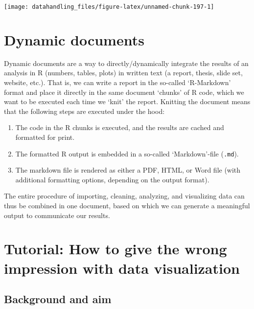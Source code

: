 \documentclass[
  12pt,
]{style/krantz}
\providecommand{\tightlist}{%
  \setlength{\itemsep}{0pt}\setlength{\parskip}{0pt}}
\begin{document}
\texttt{[image: datahandling\_files/figure-latex/unnamed-chunk-197-1]}

\hypertarget{dynamic-documents}{%
\section{Dynamic documents}\label{dynamic-documents}}

Dynamic documents are a way to directly/dynamically integrate the results of an analysis in R (numbers, tables, plots) in written text (a report, thesis, slide set, website, etc.). That is, we can write a report in the so-called `R-Markdown' format and place it directly in the same document `chunks' of R code, which we want to be executed each time we `knit' the report. Knitting the document means that the following steps are executed under the hood:

\begin{enumerate}
\def\labelenumi{\arabic{enumi}.}
\tightlist
\item
  The code in the R chunks is executed, and the results are cached and formatted for print.
\item
  The formatted R output is embedded in a so-called `Markdown'-file (\texttt{.md}).
\item
  The markdown file is rendered as either a PDF, HTML, or Word file (with additional formatting options, depending on the output format).
\end{enumerate}

The entire procedure of importing, cleaning, analyzing, and visualizing data can thus be combined in one document, based on which we can generate a meaningful output to communicate our results.

\hypertarget{tutorial-how-to-give-the-wrong-impression-with-data-visualization}{%
\section{Tutorial: How to give the wrong impression with data visualization}\label{tutorial-how-to-give-the-wrong-impression-with-data-visualization}}

\hypertarget{background-and-aim}{%
\subsection{Background and aim}\label{background-and-aim}}
\end{document}
